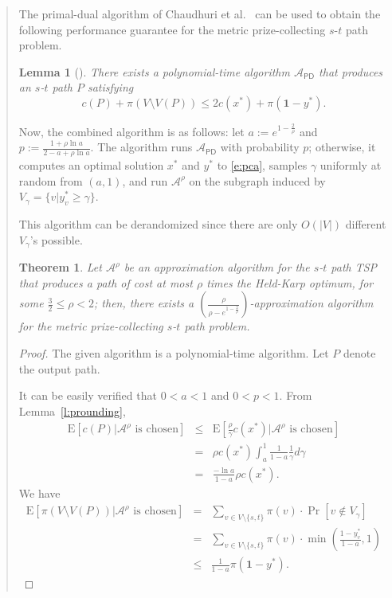 \documentclass[11pt,letterpaper]{article}
\newtheorem{lemma}{Lemma}
\newtheorem{thm}{Theorem}
\newcommand{\E}{\mathrm{E}}
\newcommand{\st}{\mbox{$s$-$t$} }
\begin{document}
\begin{quote}
The primal-dual algorithm of Chaudhuri et al.~\cite{CGRT} can be used to obtain the following performance guarantee for the metric prize-collecting \st path problem.
\begin{lemma}[\cite{CGRT, ABHK}]\label{l:cgrtpg}
There exists a polynomial-time algorithm $\mathscr{A}_\mathsf{PD}$ that produces an \st path $P$ satisfying\[
c(P)+\pi(V\setminus V(P))\leq 2c(x^*)+\pi(\mathbf{1}-y^*)
.\]
\end{lemma}

Now, the combined algorithm is as follows: let $a := e^{1-\frac{2}{\rho}}$ and $p := \frac{1+\rho\ln a}{2-a+\rho\ln a}$. The algorithm runs $\mathscr{A}_\mathsf{PD}$ with probability $p$; otherwise, it computes an optimal solution $x^*$ and $y^*$ to \eqref{e:pca}, samples $\gamma$ uniformly at random from $(a,1)$, and run $\mathscr{A}^\rho$ on the subgraph induced by $V_\gamma=\{v|y_v^*\geq \gamma\}$.

This algorithm can be derandomized since there are only $O(|V|)$ different $V_\gamma$'s possible.

\begin{thm}\label{t:pcfinal}
Let $\mathscr{A}^\rho$ be an approximation algorithm for the \st path TSP that produces a path of cost at most $\rho$ times the Held-Karp optimum, for some $\frac{3}{2}\leq\rho<2$; then, there exists a $\displaystyle \left(\frac{\displaystyle \rho}{\rho-e^{1-\frac{2}{\rho}}}\right)$-approximation algorithm for the metric prize-collecting \st path problem.
\end{thm}
\begin{proof}
The given algorithm is a polynomial-time algorithm. Let $P$ denote the output path.

It can be easily verified that $0<a<1$ and $0<p<1$. From Lemma~\ref{l:prounding},\begin{eqnarray}
\E[c(P)|\mathscr{A}^\rho\textrm{ is chosen}] &\leq& \E[\frac{\rho}{\gamma}c(x^*)|\mathscr{A}^\rho\textrm{ is chosen}]\nonumber\\
&=&\rho c(x^*)\int_{a}^{1}\frac{1}{1-a}\frac{1}{\gamma}d\gamma\nonumber\\
&=&\frac{-\ln a}{1-a}\rho c(x^*)\label{e:pcfinal1}
.\end{eqnarray}
We have\begin{eqnarray}
\E[\pi (V\setminus V(P))|\mathscr{A}^\rho\textrm{ is chosen}] &=& \sum_{v\in V\setminus\{s,t\}} \pi(v)\cdot\Pr[v\notin V_\gamma]\nonumber\\
&=&\sum_{v\in V\setminus\{s,t\}} \pi(v)\cdot\min\left(\frac{1-y^*_v}{1-a},1\right)\nonumber\\
&\leq& \frac{1}{1-a}\pi(\mathbf{1}-y^*)\label{e:pcfinal2}
.\end{eqnarray}


\end{proof}
\end{quote}
\end{document}

